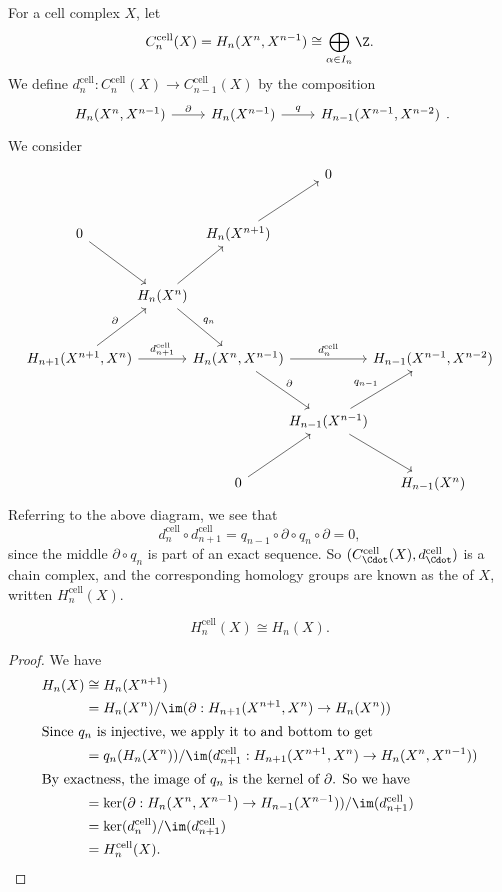 \documentclass[a4paper]{article}
\begin{document}
For a cell complex $X$, let
\[
  C_n^{\mathrm{cell}}(X) = H_n(X^n, X^{n - 1}) \cong \bigoplus_{\alpha \in I_n} \Z.
\]
We define $d_n^{\mathrm{cell}}: C_n^{\mathrm{cell}}(X) \to C_{n - 1}^{\mathrm{cell}}(X)$ by the composition
\[
  \begin{tikzcd}
    H_n(X^n, X^{n - 1}) \ar[r, "\partial"] & H_n(X^{n - 1}) \ar[r, "q"] & H_{n - 1}(X^{n - 1}, X^{n - 2})
  \end{tikzcd}.
\]
We consider
\[
  \begin{tikzcd}[row sep=large, column sep=-0.5em]
    &&& 0\\
    0 \ar[dr] && H_n(X^{n + 1}) \ar[ur]\\
    &H_n(X^n) \ar[ur] \ar[dr, "q_n"]\\
    H_{n + 1}(X^{n + 1}, X^n) \ar[ur, "\partial"] \ar[rr, "d_{n + 1}^{\mathrm{cell}}"] & & H_n(X^n, X^{n - 1}) \ar[rr, "d_n^{\mathrm{cell}}"] \ar[rd, "\partial"] && H_{n - 1}(X^{n - 1}, X^{n - 2})\\
    & & & H_{n - 1}(X^{n - 1}) \ar[rd] \ar[ru, "q_{n - 1}"]\\
    & & 0 \ar[ur] & & H_{n - 1}(X^n)
  \end{tikzcd}
\]
Referring to the above diagram, we see that
\[
  d_n^{\mathrm{cell}} \circ d_{n + 1}^{\mathrm{cell}} = q_{n - 1} \circ \partial \circ q_n \circ \partial = 0,
\]
since the middle $\partial \circ q_n$ is part of an exact sequence. So $(C_{\Cdot}^{\mathrm{cell}}(X), d_{\Cdot}^{\mathrm{cell}})$ is a chain complex, and the corresponding homology groups are known as the  of $X$, written $H_n^{\mathrm{cell}}(X)$.

\begin{thm}
  \[
    H_n^{\mathrm{cell}}(X) \cong H_n(X).
  \]
\end{thm}

\begin{proof}
  We have
  \begin{align*}
    H_n(X) &\cong H_n(X^{n + 1}) \\
    &= H_n(X^n)/\im(\partial: H_{n + 1}(X^{n + 1}, X^n) \to H_n(X^n))\\
    \intertext{Since $q_n$ is injective, we apply it to and bottom to get}
    &= q_n(H_n(X^n)) / \im(d_{n + 1}^{\mathrm{cell}}: H_{n + 1}(X^{n + 1}, X^n) \to H_n(X^n, X^{n - 1}))\\
    \intertext{By exactness, the image of $q_n$ is the kernel of $\partial$. So we have}
    &= \ker(\partial: H_n(X^n, X^{n - 1}) \to H_{n - 1}(X^{n - 1})) / \im(d_{n + 1}^{\mathrm{cell}})\\
    &= \ker(d_n^{\mathrm{cell}}) / \im(d_{n + 1}^{\mathrm{cell}})\\
    &= H_n^{\mathrm{cell}}(X).
  \end{align*}
\end{proof}
\end{document}
